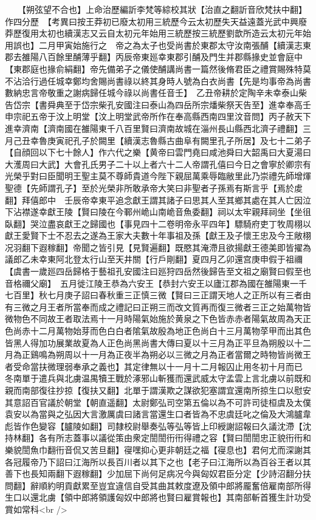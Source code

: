　　【朔弦望不合也】上命治歷編訢李梵等綜校其狀【治直之翻訢音欣梵扶中翻】作四分歷　【考異曰按王莽初已廢太初用三統歷今云太初歷失天益遠蓋光武中興廢莽歷復用太初也續漢志又云自太初元年始用三統歷按三統歷劉歆所造云太初元年始用誤也】二月甲寅始施行之　帝之為太子也受尚書於東郡太守汝南張酺【續漢志東郡去雒陽八百餘里酺薄乎翻】丙辰帝東廵幸東郡引酺及門生并郡縣掾史並會庭中【東郡庭也掾俞絹翻】帝先備弟子之儀使酺講尚書一篇然後脩君臣之禮賞賜殊特莫不沾洽行過任城幸鄭均舍賜尚書祿以終其身時人號為白衣尚書【先是均事帝為尚書數納忠言帝敬重之謝病歸任城今祿以尚書任音壬】　乙丑帝耕於定陶辛未幸泰山柴告岱宗【書舜典至于岱宗柴孔安國注曰泰山為四岳所宗燔柴祭天告至】進幸奉高壬申宗祀五帝于汶上明堂【汶上明堂武帝所作在奉高縣西南四里汶音問】丙子赦天下進幸濟南【濟南國在雒陽東千八百里賢曰濟南故城在淄州長山縣西北濟子禮翻】三月己丑幸魯庚寅祀孔子於闕里【續漢志魯縣古曲阜有闕里孔子所居】及七十二弟子【自顔回以下七十餘人】作六代之樂【黄帝曰雲門堯曰咸池舜曰大韶禹曰大夏湯曰大濩周曰大武】大會孔氏男子二十以上者六十二人帝謂孔僖曰今日之會寧於卿宗有光榮乎對曰臣聞明王聖主莫不尊師貴道今陛下親屈萬乘辱臨敝里此乃崇禮先師增煇聖德【先師謂孔子】至於光榮非所敢承帝大笑曰非聖者子孫焉有斯言乎【焉於䖍翻】拜僖郎中　壬辰帝幸東平追念獻王謂其諸子曰思其人至其鄉其處在其人亡因泣下沾襟遂幸獻王陵【賢曰陵在今鄆州峗山南峗音魚委翻】祠以太牢親拜祠坐【坐徂臥翻】哭泣盡哀獻王之歸國也【事見四十二卷明帝永平四年】驃騎府吏丁牧周栩以獻王愛賢下士不忍去之遂為王家大夫數十年事祖及孫【獻王及子懷王忠及今王敞栩况羽翻下遐稼翻】帝聞之皆引見【見賢遍翻】既愍其淹滯且欲揚獻王德美即皆擢為議郎乙未幸東阿北登太行山至天井關【行戶剛翻】夏四月乙卯還宫庚申假于祖禰【虞書一歲廵四岳歸格于藝祖孔安國注曰廵狩四岳然後歸告至文祖之廟賢曰假至也音格禰父廟】　五月徙江陵王恭為六安王【恭封六安王以廬江郡為國在雒陽東一千七百里】秋七月庚子詔曰春秋重三正慎三微【賢曰三正謂天地人之正所以有三者由有三微之月王者所當奉而成之禮記曰正朔三而改文質再而復三微者三正之始萬物皆微物色不同故王者取法焉十一月時陽氣始施於黄泉之下色皆赤赤者陽氣故周為天正色尚赤十二月萬物始芽而色白白者隂氣故殷為地正色尚白十三月萬物莩甲而出其色皆黑人得加功展業故夏為人正色尚黑尚書大傳曰夏以十三月為正平旦為朔殷以十二月為正鷄鳴為朔周以十一月為正夜半為朔必以三微之月為正者當爾之時物皆尚微王者受命當扶微理弱奉承之義也】其定律無以十一月十二月報囚止用冬初十月而已　冬南單于遣兵與北虜温禺犢王戰於涿邪山斬獲而還武威太守孟雲上言北虜以前既和親而南部復往抄掠【復扶又翻】北單于謂漢欺之謀欲犯塞謂宜還南所掠生口以慰安其意詔百官議於朝堂【朝直遥翻】太尉鄭弘司空第五倫以為不可許司徒桓虞及太僕袁安以為當與之弘因大言激厲虞曰諸言當還生口者皆為不忠虞廷叱之倫及大鴻臚韋彪皆作色變容【臚陵如翻】司隸校尉舉奏弘等弘等皆上印綬謝詔報曰久議沈滯【沈持林翻】各有所志蓋事以議從策由衆定誾誾衎衎得禮之容【賢曰誾誾忠正貌衎衎和樂貌誾魚巾翻衎音侃又苦旦翻】寑嘿抑心更非朝廷之福【寑息也】君何尤而深謝其各冠履帝乃下詔曰江海所以長百川者以其下之也【老子曰江海所以為百谷王者以其善下也長知兩翻下遐稼翻】少加屈下尚何足病况今與匈奴君臣分定【少詩沼翻分扶問翻】辭順約明貢獻累至豈宜違信自受其曲其敕度遼及領中郎將龎奮倍雇南部所得生口以還北虜【領中郎將領護匈奴中郎將也賢曰雇賞報也】其南部斬首獲生計功受賞如常科<br />

